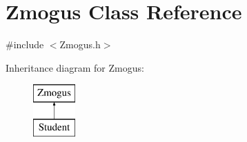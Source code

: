 \hypertarget{class_zmogus}{}\section{Zmogus Class Reference}
\label{class_zmogus}


{\ttfamily \#include $<$Zmogus.\+h$>$}

Inheritance diagram for Zmogus\+:\begin{figure}[H]
\begin{center}
\leavevmode
\includegraphics[height=2.000000cm]{class_zmogus}
\end{center}
\end{figure}
